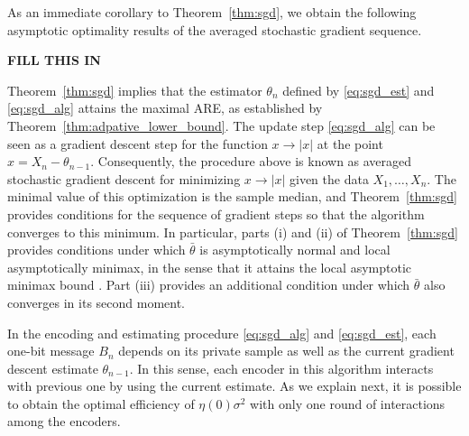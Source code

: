 As an immediate corollary to Theorem~\ref{thm:sgd}, we obtain the following
asymptotic optimality results of the averaged stochastic gradient
sequence.

\textbf{FILL THIS IN}


Theorem~\ref{thm:sgd} implies that the estimator ${\theta}_n$ defined by \eqref{eq:sgd_est} and \eqref{eq:sgd_alg} attains the maximal ARE, as established by Theorem~\ref{thm:adpative_lower_bound}. %
%
The update step \eqref{eq:sgd_alg} can be seen as a gradient descent step for the function $x\to |x|$ at the point $x=X_n - \theta_{n-1}$. Consequently, the procedure above is known as averaged stochastic gradient descent for minimizing $x \to |x|$ given the data $X_1,\ldots,X_n$. The minimal value of this optimization is the sample median, and Theorem~\ref{thm:sgd} provides conditions for the sequence of gradient steps so that the algorithm converges to this minimum. In particular, parts (i) and (ii) of Theorem~\ref{thm:sgd} provides conditions under which $\bar{\theta}$ is asymptotically normal and local asymptotically minimax, in the sense that it attains the local asymptotic minimax bound \cite{van2000asymptotic}. Part (iii) provides an additional condition under which $\bar{\theta}$ also converges in its second moment. 
 \par
In the encoding and estimating procedure \eqref{eq:sgd_alg} and \eqref{eq:sgd_est}, each one-bit message $B_n$ depends on its private sample as well as the current gradient descent estimate $\theta_{n-1}$. In this sense, each encoder in this algorithm interacts with previous one by using the current estimate.
%
As we explain next, 
it is possible to obtain the optimal efficiency of $\eta(0)\sigma^2$ with only one round of interactions among the encoders. 




